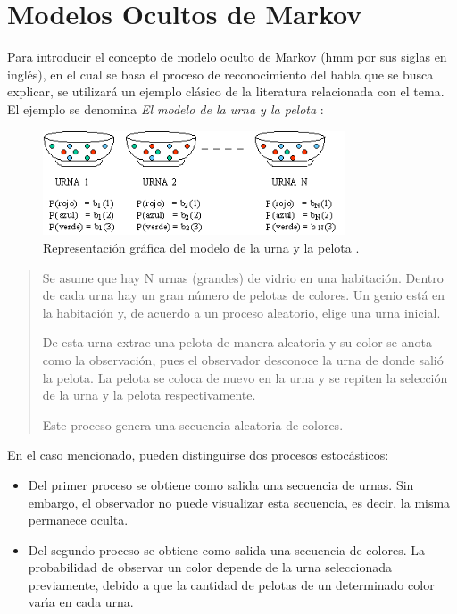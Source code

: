 \section{Modelos Ocultos de Markov}
\label{sec:hmm}

Para introducir el concepto de modelo oculto de Markov (\gls{hmm} por sus siglas en ingl\'es), 
en el cual se basa el proceso de reconocimiento del habla que se busca explicar, 
se utilizar\'a un ejemplo cl\'asico de la literatura relacionada con el tema.
El ejemplo se denomina \emph{El modelo de la urna y la pelota} \cite{Rabiner89atutorial}:

\begin{figure}[H] 
\centering
\includegraphics[width=0.8\textwidth]{./graphics/urnas.png}
\caption{Representaci\'on gr\'afica del modelo de la urna y la pelota \cite{LleidaModelado}.}
\label{figure:urnas}
\end{figure}

\begin{quote}
	Se asume que hay N urnas (grandes) de vidrio en una habitaci\'on. Dentro de cada urna hay un gran 
	n\'umero de pelotas de colores. Un genio est\'a en la habitaci\'on y, de acuerdo a un proceso aleatorio, elige una urna inicial.

	De esta urna extrae una pelota de manera aleatoria y su color se anota como la observaci\'on, 
	pues el observador desconoce la urna de donde sali\'o la pelota.
	La pelota se coloca de nuevo en la urna y se repiten la selecci\'on de la urna y la pelota respectivamente.
	
	Este proceso genera una secuencia aleatoria de colores.
\end{quote}
\vspace*{1\baselineskip}

En el caso mencionado, pueden distinguirse dos procesos estoc\'asticos:
\begin{itemize}
	\item Del primer proceso se obtiene como salida una secuencia de urnas. Sin embargo, el observador
	no puede visualizar esta secuencia, es decir, la misma permanece oculta.
	\item Del segundo proceso se obtiene como salida una secuencia de colores. La probabilidad de observar
	un color depende de la urna seleccionada previamente, debido a que la cantidad de pelotas de un determinado
	color var{\'\i}a en cada urna.
\end{itemize}

